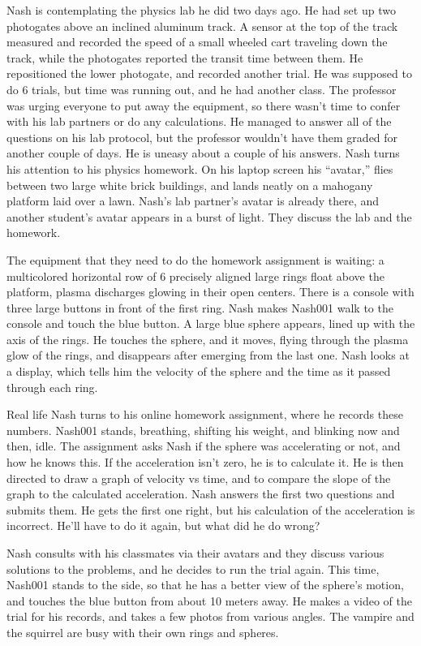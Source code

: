 \documentclass[11.5pt]{sig-alternate} %
\begin{document}
\begin{large}
Nash is contemplating the physics lab he did two days ago. He had set up two photogates above an inclined aluminum track. A sensor at the top of the track measured and recorded the speed of a small wheeled cart traveling down the track, while the photogates reported the transit time between them. He repositioned the lower photogate, and recorded another trial. He was supposed to do 6 trials, but time was running out, and he had another class. The professor was urging everyone to put away the equipment, so there wasn’t time to confer with his lab partners or do any calculations. He managed to answer all of the questions on his lab protocol, but the professor wouldn’t have them graded for another couple of days. He is uneasy about a couple of his answers. Nash turns his attention to his physics homework. On his laptop screen his “avatar,” flies between two large white brick buildings, and lands neatly on a mahogany platform laid over a lawn. Nash’s lab partner’s avatar is already there, and another student’s avatar appears in a burst of light. They discuss the lab and the homework.

The equipment that they need to do the homework assignment is waiting: a multicolored horizontal row of 6 precisely aligned large rings float above the platform, plasma discharges glowing in their open centers. There is a console with three large buttons in front of the first ring. Nash makes Nash001 walk to the console and touch the blue button. A large blue sphere appears, lined up with the axis of the rings. He touches the sphere, and it moves, flying through the plasma glow of the rings, and disappears after emerging from the last one. Nash looks at a display, which tells him the velocity of the sphere and the time as it passed through each ring.

Real life Nash turns to his online homework assignment, where he records these numbers. Nash001 stands, breathing, shifting his weight, and blinking now and then, idle. The assignment asks Nash if the sphere was accelerating or not, and how he knows this. If the acceleration isn’t zero, he is to calculate it. He is then directed to draw a graph of velocity vs time, and to compare the slope of the graph to the calculated acceleration. Nash answers the first two questions and submits them. He gets the first one right, but his calculation of the acceleration is incorrect. He’ll have to do it again, but what did he do wrong?

Nash consults with his classmates via their avatars and they discuss various solutions to the problems, and he decides to run the trial again. This time, Nash001 stands to the side, so that he has a better view of the sphere’s motion, and touches the blue button from about 10 meters away. He makes a video of the trial for his records, and takes a few photos from various angles. The vampire and the squirrel are busy with their own rings and spheres.


\end{large}
\end{document}
